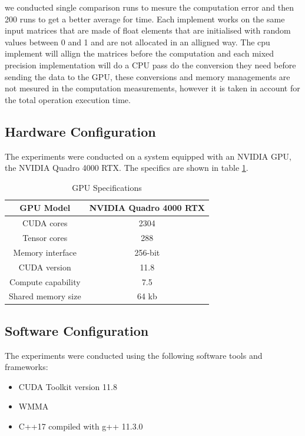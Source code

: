 \documentclass[conference]{IEEEtran}
\begin{document}
  we conducted single comparison runs to mesure the computation error and then 200 runs to get a better average for time.
  Each implement works on the same input matrices that are made of float elements that are initialised with random values between 0 and 1
  and are not allocated in an alligned way. The cpu implement will allign the matrices before the computation and each mixed precision implementation will do a CPU pass do the conversion they need
  before sending the data to the GPU, these conversions and memory managements are not mesured in the computation 
  measurements, however it is taken in account for the total operation execution time.

  \subsection{Hardware Configuration}\label{sec:hardware-configuration}
  
  The experiments were conducted on a system equipped with an NVIDIA GPU, the NVIDIA Quadro 4000 RTX.
  The specifics are shown in table \ref{GPU}.
  
  \begin{table}[htbp]
  \caption{GPU Specifications\cite{Voltatuningguide}}
  \centering
  \label{GPU}
    \begin{tabular}{|c|c|}
    \hline
    GPU Model & NVIDIA Quadro 4000 RTX \\
    \hline
    CUDA cores & 2304 \\
    \hline
    Tensor cores & 288 \\
    \hline
    Memory interface & 256-bit \\
    \hline
    CUDA version & 11.8 \\
    \hline
    Compute capability & 7.5 \\
    \hline
    Shared memory size & 64 kb \\
    \hline
    
  \end{tabular}
  \end{table}
  
  \subsection{Software Configuration}\label{sec:software-configuration}
  
  The experiments were conducted using the following software tools and frameworks:
  
  \begin{itemize}
    \item CUDA Toolkit version 11.8
    \item WMMA
    \item C++17 compiled with g++ 11.3.0
  \end{itemize}
\end{document}
